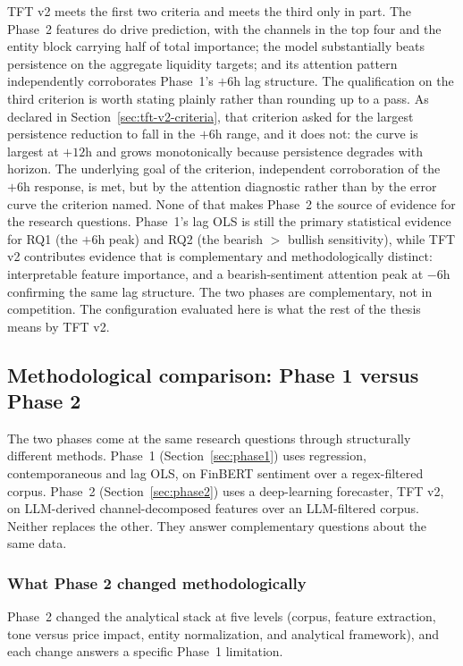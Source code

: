TFT v2 meets the first two criteria and meets the third only in part. The Phase~2 features do drive prediction, with the channels in the top four and the entity block carrying half of total importance; the model substantially beats persistence on the aggregate liquidity targets; and its attention pattern independently corroborates Phase~1's $+6$h lag structure. The qualification on the third criterion is worth stating plainly rather than rounding up to a pass. As declared in Section~\ref{sec:tft-v2-criteria}, that criterion asked for the largest persistence reduction to fall in the $+6$h range, and it does not: the curve is largest at $+12$h and grows monotonically because persistence degrades with horizon. The underlying goal of the criterion, independent corroboration of the $+6$h response, is met, but by the attention diagnostic rather than by the error curve the criterion named. None of that makes Phase~2 the source of evidence for the research questions. Phase~1's lag OLS is still the primary statistical evidence for RQ1 (the $+6$h peak) and RQ2 (the bearish $>$ bullish sensitivity), while TFT v2 contributes evidence that is complementary and methodologically distinct: interpretable feature importance, and a bearish-sentiment attention peak at $-6$h confirming the same lag structure. The two phases are complementary, not in competition. The configuration evaluated here is what the rest of the thesis means by TFT v2.

\subsection{Methodological comparison: Phase 1 versus Phase 2}\label{sec:phase-comparison}

The two phases come at the same research questions through structurally different methods. Phase~1 (Section~\ref{sec:phase1}) uses regression, contemporaneous and lag OLS, on FinBERT sentiment over a regex-filtered corpus. Phase~2 (Section~\ref{sec:phase2}) uses a deep-learning forecaster, TFT v2, on LLM-derived channel-decomposed features over an LLM-filtered corpus. Neither replaces the other. They answer complementary questions about the same data.

\subsubsection{What Phase 2 changed methodologically}

Phase~2 changed the analytical stack at five levels (corpus, feature extraction, tone versus price impact, entity normalization, and analytical framework), and each change answers a specific Phase~1 limitation.

